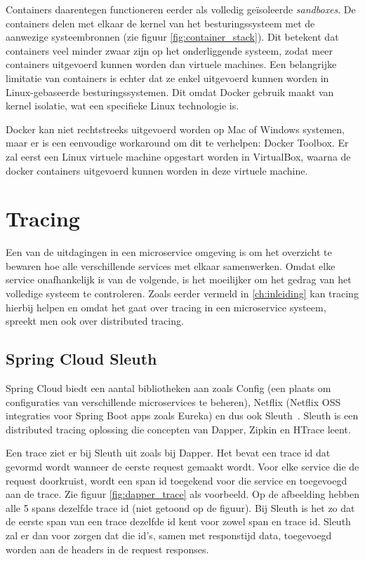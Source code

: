 Containers daarentegen functioneren eerder als volledig geïsoleerde \textit{sandboxes}. De containers delen met elkaar de kernel van het besturingssysteem met de aanwezige systeembronnen (zie figuur \ref{fig:container_stack}). Dit betekent dat containers veel minder zwaar zijn op het onderliggende systeem, zodat meer containers uitgevoerd kunnen worden dan virtuele machines. Een belangrijke limitatie van containers is echter dat ze enkel uitgevoerd kunnen worden in Linux-gebaseerde besturingssystemen. Dit omdat Docker gebruik maakt van kernel isolatie, wat een specifieke Linux technologie is.

Docker kan niet rechtstreeks uitgevoerd worden op Mac of Windows systemen, maar er is een eenvoudige workaround om dit te verhelpen: Docker Toolbox. Er zal eerst een Linux virtuele machine opgestart worden in VirtualBox, waarna de docker containers uitgevoerd kunnen worden in deze virtuele machine.

\section{Tracing}
\label{sec:tracing}

Een van de uitdagingen in een microservice omgeving is om het overzicht te bewaren hoe alle verschillende services met elkaar samenwerken. Omdat elke service onafhankelijk is van de volgende, is het moeilijker om het gedrag van het volledige systeem te controleren. Zoals eerder vermeld in \ref{ch:inleiding} kan tracing hierbij helpen en omdat het gaat over tracing in een microservice systeem, spreekt men ook over distributed tracing.

\subsection{Spring Cloud Sleuth}
\label{sec:sleuth}

Spring Cloud biedt een aantal bibliotheken aan zoals Config (een plaats om configuraties van verschillende microservices te beheren), Netflix (Netflix OSS integraties voor Spring Boot apps zoals Eureka) en dus ook Sleuth~\autocite{SpringCloud2015}. Sleuth is een distributed tracing oplossing die concepten van Dapper, Zipkin en HTrace leent.

Een trace ziet er bij Sleuth uit zoals bij Dapper. Het bevat een trace id dat gevormd wordt wanneer de eerste request gemaakt wordt. Voor elke service die de request doorkruist, wordt een span id toegekend voor die service en toegevoegd aan de trace. Zie figuur \ref{fig:dapper_trace} als voorbeeld. Op de afbeelding hebben alle 5 spans dezelfde trace id (niet getoond op de figuur). Bij Sleuth is het zo dat de eerste span van een trace dezelfde id kent voor zowel span en trace id. Sleuth zal er dan voor zorgen dat die id's, samen met responstijd data, toegevoegd worden aan de headers in de request responses.


